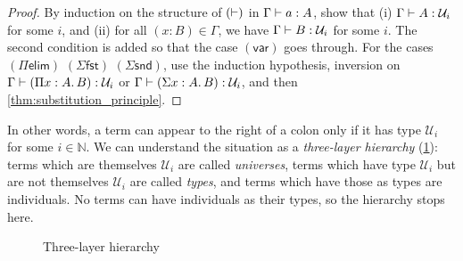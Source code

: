 \documentclass[twoside]{report}
\begin{document}
\begin{proof}
    By induction on the structure of $(\vdash)$ in $\Gamma \vdash a : A$, show that (i) $\Gamma \vdash A : \mathcal U_i$ for some $i$, and (ii) for all $(x : B) \in \Gamma$, we have $\Gamma \vdash B : \mathcal U_i$ for some $i$. The second condition is added so that the case $(\mathsf{var})$ goes through. For the cases $(\Pi\mathsf{elim})$ $(\Sigma\mathsf{fst})$ $(\Sigma\mathsf{snd})$, use the induction hypothesis, inversion on $\Gamma \vdash (\Pi{x} : {A}.\,{B}) : \mathcal U_i$ or $\Gamma \vdash (\Sigma{x} : {A}.\,{B}) : \mathcal U_i$, and then \cref{thm:substitution_principle}.
\end{proof}

In other words, a term can appear to the right of a colon only if it has type $\mathcal U_i$ for some $i \in \mathbb N$. We can understand the situation as a \emph{three-layer hierarchy} (\cref{fig:three_layer_hierarchy}): terms which are themselves $\mathcal U_i$ are called \emph{universes}, terms which have type $\mathcal U_i$ but are not themselves $\mathcal U_i$ are called \emph{types}, and terms which have those as types are individuals. No terms can have individuals as their types, so the hierarchy stops here.

\begin{figure}[ht]
    \centering
    \caption{Three-layer hierarchy}
    \label{fig:three_layer_hierarchy}
\end{figure}
\end{document}
